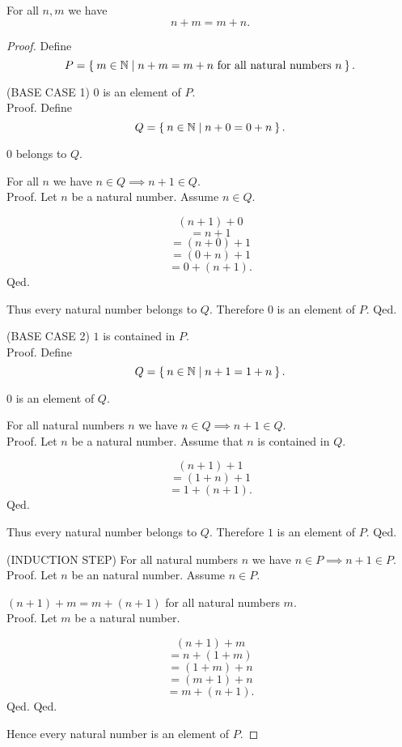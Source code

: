 \documentclass[../../arithmetic.ftl.tex]{subfiles}
\begin{document}
  \begin{forthel}
    \begin{proposition}\label{Arithmetic_01_02_273100}
      For all $n,m$ we have \[ n + m = m + n. \]
    \end{proposition}
    \begin{proof}
      Define \[ P = \Set{m \in \mathbb{N} | \text{$n + m = m + n$ for all natural numbers $n$}}. \]

      (BASE CASE 1) $0$ is an element of $P$. \\
      Proof.
        Define \[ Q = \Set{n \in \mathbb{N} | n + 0 = 0 + n}. \]

        $0$ belongs to $Q$.

        For all $n$ we have $n \in Q \implies n + 1 \in Q$. \\
        Proof.
          Let $n$ be a natural number.
          Assume $n \in Q$.

          \[   (n + 1) + 0 \]
          \[ = n + 1 \]        %
          \[ = (n + 0) + 1 \]  %
          \[ = (0 + n) + 1 \]  %
          \[ = 0 + (n + 1). \] %
        Qed.

        Thus every natural number belongs to $Q$.
        Therefore $0$ is an element of $P$.
      Qed.

      (BASE CASE 2) $1$ is contained in $P$. \\
      Proof.
        Define \[ Q = \Set{n \in \mathbb{N} | n + 1 = 1 + n}. \]

        $0$ is an element of $Q$.

        For all natural numbers $n$ we have $n \in Q \implies n + 1 \in Q$. \\
        Proof.
          Let $n$ be a natural number.
          Assume that $n$ is contained in $Q$.

          \[   (n + 1) + 1 \]
          \[ = (1 + n) + 1 \]  %
          \[ = 1 + (n + 1). \] %
        Qed.

        Thus every natural number belongs to $Q$.
        Therefore $1$ is an element of $P$.
      Qed.

      (INDUCTION STEP) For all natural numbers $n$ we have $n \in P \implies n + 1 \in P$. \\
      Proof.
        Let $n$ be an natural number.
        Assume $n \in P$.

        $(n + 1) + m = m + (n + 1)$ for all natural numbers $m$. \\
        Proof.
          Let $m$ be a natural number.

          \[   (n + 1) + m \]
          \[ = n + (1 + m) \]  %
          \[ = (1 + m) + n \]  %
          \[ = (m + 1) + n \]  %
          \[ = m + (n + 1). \] %
        Qed.
      Qed.

      Hence every natural number is an element of $P$.
    \end{proof}
  \end{forthel}
\end{document}
